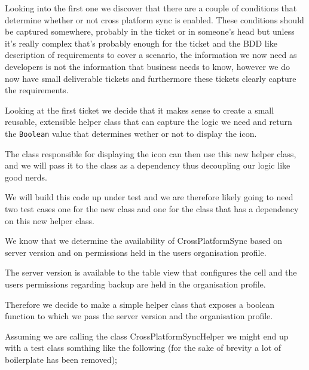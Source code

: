 \documentclass[a4paper, titlepage]{article}
\begin{document}
  Looking into the first one we discover that there are a couple of
  conditions that determine whether or not cross platform sync is
  enabled. These conditions should be captured somewhere, probably in the
  ticket or in someone's head but unless it's really complex that's
  probably enough for the ticket and the BDD like description of
  requirements to cover a scenario, the information we now need as
  developers is not the information that business needs to know, however
  we do now have small deliverable tickets and furthermore these tickets
  clearly capture the requirements.
  
  
  Looking at the first ticket we decide that it makes sense to create a
  small reusable, extensible helper class that can capture the logic
  we need and return the \texttt{Boolean} value that determines wether or not to
  display the icon. 
  
  The class responsible for displaying the icon can
  then use this new helper class, and we will pass it to the class as a
  dependency thus decoupling our logic like good nerds.

  We will build this code up under test and we are therefore likely
  going to need two test cases one for the new class and one for the
  class that has a dependency on this new helper class.

  We know that we determine the availability of CrossPlatformSync based
  on server version and on permissions held in the users organisation
  profile.

  The server version is available to the table view that configures the
  cell and the users permissions regarding backup are held in the
  organisation profile.

  Therefore we decide to make a simple helper class that exposes a boolean
  function to which we pass the server version and the organisation
  profile.

  Assuming we are calling the class CrossPlatformSyncHelper we might
  end up with a test class somthing like the following (for the sake of
  brevity a lot of boilerplate has been removed);
\end{document}
